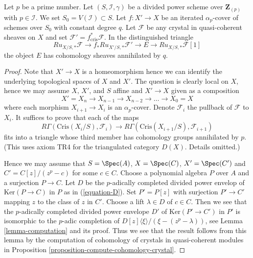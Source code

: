 \begin{lemma}
\label{lemma-pullback-along-p-power-cover}
Let $p$ be a prime number. Let $(S, \mathcal{I}, \gamma)$ be a divided power
scheme over $\mathbf{Z}_{(p)}$ with $p \in \mathcal{I}$. We set
$S_0 = V(\mathcal{I}) \subset S$. Let $f : X' \to X$ be an iterated
$\alpha_p$-cover of schemes over $S_0$ with constant degree $q$. Let
$\mathcal{F}$ be any crystal in quasi-coherent sheaves on $X$ and set
$\mathcal{F}' = f_{\text{cris}}^*\mathcal{F}$.
In the distinguished triangle
$$
Ru_{X/S, *}\mathcal{F}
\longrightarrow
f_*Ru_{X'/S, *}\mathcal{F}'
\longrightarrow
E
\longrightarrow
Ru_{X/S, *}\mathcal{F}[1]
$$
the object $E$ has cohomology sheaves annihilated by $q$.
\end{lemma}

\begin{proof}
Note that $X' \to X$ is a homeomorphism hence we can identify the underlying
topological spaces of $X$ and $X'$. The question is clearly local on $X$,
hence we may assume $X$, $X'$, and $S$ affine and $X' \to X$ given as a
composition
$$
X' = X_n \to X_{n - 1} \to X_{n - 2} \to \ldots \to X_0 = X
$$
where each morphism $X_{i + 1} \to X_i$ is an $\alpha_p$-cover.
Denote $\mathcal{F}_i$ the pullback of $\mathcal{F}$ to $X_i$.
It suffices to prove that each of the maps
$$
R\Gamma(\text{Cris}(X_i/S), \mathcal{F}_i)
\longrightarrow
R\Gamma(\text{Cris}(X_{i + 1}/S), \mathcal{F}_{i + 1})
$$
fits into a triangle whose third member has cohomology groups annihilated
by $p$. (This uses axiom TR4 for the triangulated category $D(X)$. Details
omitted.)

\medskip\noindent
Hence we may assume that $S = \Spec(A)$, $X = \Spec(C)$, $X' = \Spec(C')$
and $C' = C[z]/(z^p - c)$ for some $c \in C$. Choose a polynomial algebra
$P$ over $A$ and a surjection $P \to C$. Let $D$ be the $p$-adically completed
divided power envelop of $\text{Ker}(P \to C)$ in $P$ as in (\ref{equation-D}).
Set $P' = P[z]$ with surjection $P' \to C'$ mapping $z$ to the class of $z$
in $C'$. Choose a lift $\lambda \in D$ of $c \in C$. Then we see that
the $p$-adically completed divided power envelope $D'$ of
$\text{Ker}(P' \to C')$ in $P'$ is isomorphic to the $p$-adic completion of
$D[z]\langle \xi \rangle/(\xi - (z^p - \lambda))$, see
Lemma \ref{lemma-computation} and its proof.
Thus we see that the result follows from this lemma
by the computation of cohomology of crystals in quasi-coherent modules in
Proposition \ref{proposition-compute-cohomology-crystal}.
\end{proof}

